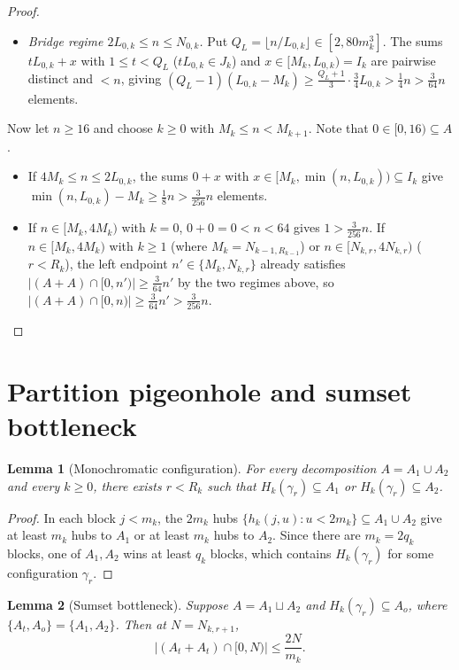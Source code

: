 \documentclass[11pt,a4paper]{amsart}
\newtheorem{lemma}{Lemma}
\theoremstyle{remark}
\begin{document}
\begin{proof}
\begin{itemize}
\[\]
\item \emph{Bridge regime $2 L_{0,k} \le n \le N_{0,k}$.} Put $Q_L = \lfloor n / L_{0,k} \rfloor \in [2, 80 m_k^3]$. The sums $t L_{0,k} + x$ with $1 \le t < Q_L$ ($t L_{0,k} \in J_k$) and $x \in [M_k, L_{0,k}) = I_k$ are pairwise distinct and $< n$, giving $(Q_L - 1)(L_{0,k} - M_k) \ge \frac{Q_L + 1}{3} \cdot \frac{3}{4} L_{0,k} > \frac{1}{4} n > \frac{3}{64} n$ elements.
\end{itemize}
Now let $n \ge 16$ and choose $k \ge 0$ with $M_k \le n < M_{k+1}$. Note that $0 \in [0, 16) \subseteq A$.
\begin{itemize}
\item If $4 M_k \le n \le 2 L_{0,k}$, the sums $0 + x$ with $x \in [M_k, \min(n, L_{0,k})) \subseteq I_k$ give $\min(n, L_{0,k}) - M_k \ge \frac{1}{8} n > \frac{3}{256} n$ elements.
\item If $n \in [M_k, 4 M_k)$ with $k = 0$, $0 + 0 = 0 < n < 64$ gives $1 > \frac{3}{256} n$. If $n \in [M_k, 4 M_k)$ with $k \ge 1$ (where $M_k = N_{k-1, R_{k-1}}$) or $n \in [N_{k,r}, 4 N_{k,r})$ ($r < R_k$), the left endpoint $n' \in \{M_k, N_{k,r}\}$ already satisfies $|(A + A) \cap [0, n')| \ge \frac{3}{64} n'$ by the two regimes above, so $|(A + A) \cap [0, n)| \ge \frac{3}{64} n' > \frac{3}{256} n$. \qedhere
\end{itemize}
\end{proof}

\section{Partition pigeonhole and sumset bottleneck}

\begin{lemma}[Monochromatic configuration]\label{lem:pigeon}
For every decomposition $A = A_1 \cup A_2$ and every $k \ge 0$, there exists $r < R_k$ such that $H_k(\gamma_r) \subseteq A_1$ or $H_k(\gamma_r) \subseteq A_2$.
\end{lemma}

\begin{proof}
In each block $j < m_k$, the $2 m_k$ hubs $\{h_k(j, u) : u < 2 m_k\} \subseteq A_1 \cup A_2$ give at least $m_k$ hubs to $A_1$ or at least $m_k$ hubs to $A_2$. Since there are $m_k = 2 q_k$ blocks, one of $A_1, A_2$ wins at least $q_k$ blocks, which contains $H_k(\gamma_r)$ for some configuration $\gamma_r$.
\end{proof}

\begin{lemma}[Sumset bottleneck]\label{lem:bottleneck}
Suppose $A = A_1 \sqcup A_2$ and $H_k(\gamma_r) \subseteq A_o$, where $\{A_t, A_o\} = \{A_1, A_2\}$. Then at $N = N_{k,r+1}$,
\[
|(A_t + A_t) \cap [0, N)| \le \frac{2 N}{m_k}.
\]
\end{lemma}
\end{document}
